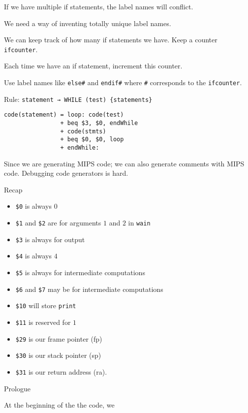 \documentclass{article}
\begin{document}
If we have multiple if statements, the label names will conflict.

We need a way of inventing totally unique label names.

We can keep track of how many if statements we have. Keep a counter
\texttt{ifcounter}.

Each time we have an if statement, increment this counter.

Use label names like \texttt{else\#} and \texttt{endif\#} where
\texttt{\#} corresponds to the \texttt{ifcounter}.

Rule: \texttt{statement\ →\ WHILE\ (test)\ \{statements\}}

\begin{tcolorbox}
\begin{verbatim}
code(statement) = loop: code(test)
                + beq $3, $0, endWhile
                + code(stmts)
                + beq $0, $0, loop
                + endWhile:
\end{verbatim}
\end{tcolorbox}

Since we are generating MIPS code; we can also generate comments with
MIPS code. Debugging code generators is hard.

Recap

\begin{itemize}
    \item \texttt{\$0} is always \(0\)
    \item \texttt{\$1} and \texttt{\$2} are for arguments \(1\) and \(2\) in \texttt{wain}
    \item \texttt{\$3} is always
for output 
    \item \texttt{\$4} is always \(4\)
    \item  \texttt{\$5} is always for
intermediate computations
    \item \texttt{\$6} and \texttt{\$7} may be for
intermediate computations 
    \item \texttt{\$10} will store \texttt{print}
    \item \texttt{\$11} is reserved for \(1\)
    \item \texttt{\$29} is our frame pointer
(fp)
    \item \texttt{\$30} is our stack pointer (sp)
    \item \texttt{\$31} is our
return address (ra).
\end{itemize}

Prologue

At the beginning of the the code, we 
\end{document}
